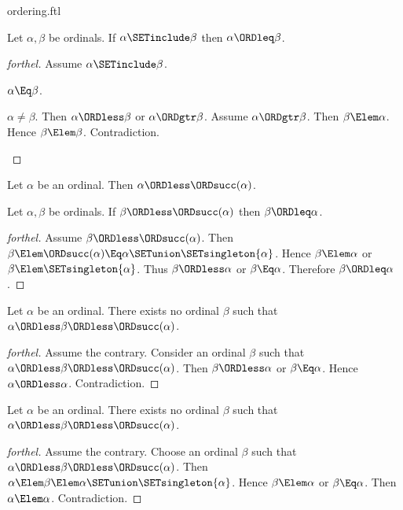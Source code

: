 \documentclass{stex}
\begin{document}
\begin{smodule}{ordering.ftl}
\begin{proposition}[forthel]
  Let $\alpha, \beta$ be ordinals.
  If $\alpha \SETinclude \beta$ then $\alpha \ORDleq \beta$.
\end{proposition}
\begin{proof}[forthel]
  Assume $\alpha \SETinclude \beta$.

  \begin{case}{$\alpha \Eq \beta$.} \end{case}

  \begin{case}{$\alpha \neq \beta$.}
    Then $\alpha \ORDless \beta$ or $\alpha \ORDgtr \beta$.
    Assume $\alpha \ORDgtr \beta$.
    Then $\beta \Elem \alpha$.
    Hence $\beta \Elem \beta$.
    Contradiction.
  \end{case}
\end{proof}

\begin{proposition}[forthel]
  Let $\alpha$ be an ordinal.
  Then $\alpha \ORDless \ORDsucc(\alpha)$.
\end{proposition}

\begin{proposition}[forthel]
  Let $\alpha, \beta$ be ordinals.
  If $\beta \ORDless \ORDsucc(\alpha)$ then $\beta \ORDleq \alpha$.
\end{proposition}
\begin{proof}[forthel]
  Assume $\beta \ORDless \ORDsucc(\alpha)$.
  Then $\beta \Elem \ORDsucc(\alpha) \Eq \alpha \SETunion \SETsingleton{\alpha}$.
  Hence $\beta \Elem \alpha$ or $\beta \Elem \SETsingleton{\alpha}$.
  Thus $\beta \ORDless \alpha$ or $\beta \Eq \alpha$.
  Therefore $\beta \ORDleq \alpha$.
\end{proof}

\begin{proposition}[forthel]
  Let $\alpha$ be an ordinal.
  There exists no ordinal $\beta$ such that $\alpha \ORDless \beta \ORDless \ORDsucc(\alpha)$.
\end{proposition}
\begin{proof}[forthel]
  Assume the contrary.
  Consider an ordinal $\beta$ such that $\alpha \ORDless \beta \ORDless \ORDsucc(\alpha)$.
  Then $\beta \ORDless \alpha$ or $\beta \Eq \alpha$.
  Hence $\alpha \ORDless \alpha$.
  Contradiction.
\end{proof}

\begin{proposition}[forthel]
  Let $\alpha$ be an ordinal.
  There exists no ordinal $\beta$ such that $\alpha \ORDless \beta \ORDless \ORDsucc(\alpha)$.
\end{proposition}
\begin{proof}[forthel]
  Assume the contrary.
  Choose an ordinal $\beta$ such that $\alpha \ORDless \beta \ORDless \ORDsucc(\alpha)$.
  Then $\alpha \Elem \beta \Elem \alpha \SETunion \SETsingleton{\alpha}$.
  Hence $\beta \Elem \alpha$ or $\beta \Eq \alpha$.
  Then $\alpha \Elem \alpha$.
  Contradiction.
\end{proof}


\end{smodule}
\end{document}
